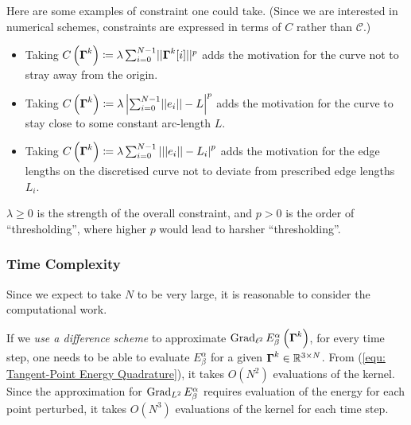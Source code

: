 \documentclass[../dissertation.tex]{subfiles}
\begin{document}
Here are some examples of constraint one could take. (Since we are interested in numerical schemes, constraints are expressed in terms of $C$ rather than $\mathcal{C}$.)
\begin{itemize}
    \item Taking $C \left( \boldsymbol{\Gamma}^k \right) \coloneqq \lambda \sum_{i=0}^{N-1} \lvert \lvert \boldsymbol{\Gamma}^k [i] \rvert \rvert^p$ adds the motivation for the curve not to stray away from the origin.
    \item Taking $C \left( \boldsymbol{\Gamma}^k \right) \coloneqq \lambda \left| \sum_{i=0}^{N-1} \lvert \lvert e_i \rvert \rvert - L \right|^p$ adds the motivation for the curve to stay close to some constant arc-length $L$.
    \item Taking $C \left( \boldsymbol{\Gamma}^k \right) \coloneqq \lambda \sum_{i=0}^{N-1} \left| \lvert \lvert e_i \rvert \rvert - L_i \right|^p$ adds the motivation for the edge lengths on the discretised curve not to deviate from prescribed edge lengths $L_i$.
\end{itemize}
$\lambda \geq 0$ is the strength of the overall constraint, and
$p > 0$ is the order of ``thresholding'', where higher $p$ would lead to harsher ``thresholding''.

\subsubsection{Time Complexity}
\label{sct: L2 Complexity}
Since we expect to take $N$ to be very large, it is reasonable to consider the computational work.

If we \textit{use a difference scheme} to approximate $\operatorname{Grad}_{\ell^2} E_{\beta}^\alpha \left( \boldsymbol{\Gamma}^k \right)$,
for every time step, one needs to be able to evaluate $E_{\beta}^\alpha$ for a given $\boldsymbol{\Gamma}^k \in \mathbb{R}^{3\times N}$.
From (\ref{equ: Tangent-Point Energy Quadrature}),
it takes $O \left( N^2 \right)$ evaluations of the kernel.
Since the approximation for $\operatorname{Grad}_{L^2} E_\beta^\alpha$ requires evaluation of the energy for each point perturbed, it takes $O \left( N^3 \right)$ evaluations of the kernel for each time step. 
\end{document}
